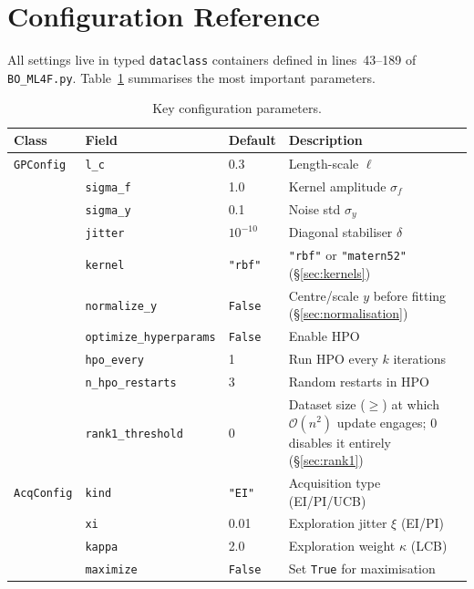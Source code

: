\documentclass[11pt,a4paper]{article}
\theoremstyle{remark}
\newcommand{\codefile}[1]{\texttt{#1}}
\newcommand{\coderange}[2]{lines~#1--#2}
\begin{document}
\section{Configuration Reference}
\label{sec:config}

All settings live in typed \texttt{dataclass} containers defined in
\coderange{43}{189} of \codefile{BO\_ML4F.py}.
Table~\ref{tab:config} summarises the most important parameters.

\begin{table}[ht]
\centering
\caption{Key configuration parameters.}
\label{tab:config}
\small
\begin{tabular}{llll}
\toprule
\textbf{Class} & \textbf{Field} & \textbf{Default} & \textbf{Description}\\
\midrule
\texttt{GPConfig} & \texttt{l\_c} & 0.3
  & Length-scale $\ell$ \\
 & \texttt{sigma\_f} & 1.0
  & Kernel amplitude $\sigma_f$ \\
 & \texttt{sigma\_y} & 0.1
  & Noise std $\sigma_y$ \\
 & \texttt{jitter} & $10^{-10}$
  & Diagonal stabiliser $\delta$ \\
 & \texttt{kernel} & \texttt{"rbf"}
  & \texttt{"rbf"} or \texttt{"matern52"} (\S\ref{sec:kernels}) \\
 & \texttt{normalize\_y} & \texttt{False}
  & Centre/scale $y$ before fitting (\S\ref{sec:normalisation}) \\
 & \texttt{optimize\_hyperparams} & \texttt{False}
  & Enable HPO \\
 & \texttt{hpo\_every} & 1
  & Run HPO every $k$ iterations \\
 & \texttt{n\_hpo\_restarts} & 3
  & Random restarts in HPO \\
 & \texttt{rank1\_threshold} & 0
  & Dataset size ($\geq$) at which $\mathcal{O}(n^2)$ update engages;
    $0$ disables it entirely (\S\ref{sec:rank1}) \\
\midrule
\texttt{AcqConfig} & \texttt{kind} & \texttt{"EI"}
  & Acquisition type (EI/PI/UCB) \\
 & \texttt{xi} & 0.01
  & Exploration jitter $\xi$ (EI/PI) \\
 & \texttt{kappa} & 2.0
  & Exploration weight $\kappa$ (LCB) \\
 & \texttt{maximize} & \texttt{False}
  & Set \texttt{True} for maximisation \\

\end{tabular}
\end{table}
\end{document}
